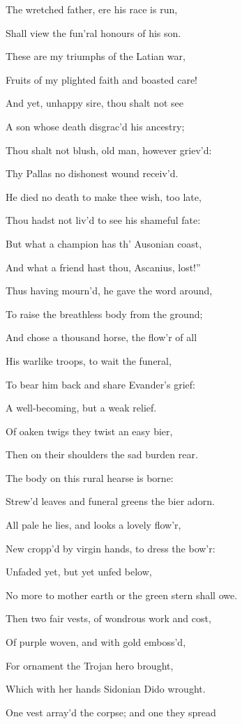 The wretched father, ere his race is run,

Shall view the fun’ral honours of his son.

These are my triumphs of the Latian war,

Fruits of my plighted faith and boasted care!

And yet, unhappy sire, thou shalt not see

A son whose death disgrac’d his ancestry;

Thou shalt not blush, old man, however griev’d:

Thy Pallas no dishonest wound receiv’d.

He died no death to make thee wish, too late,

Thou hadst not liv’d to see his shameful fate:

But what a champion has th’ Ausonian coast,

And what a friend hast thou, Ascanius, lost!”

Thus having mourn’d, he gave the word around,

To raise the breathless body from the ground;

And chose a thousand horse, the flow’r of all

His warlike troops, to wait the funeral,

To bear him back and share Evander’s grief:

A well-becoming, but a weak relief.

Of oaken twigs they twist an easy bier,

Then on their shoulders the sad burden rear.

The body on this rural hearse is borne:

Strew’d leaves and funeral greens the bier adorn.

All pale he lies, and looks a lovely flow’r,

New cropp’d by virgin hands, to dress the bow’r:

Unfaded yet, but yet unfed below,

No more to mother earth or the green stern shall owe.

Then two fair vests, of wondrous work and cost,

Of purple woven, and with gold emboss’d,

For ornament the Trojan hero brought,

Which with her hands Sidonian Dido wrought.

One vest array’d the corpse; and one they spread

